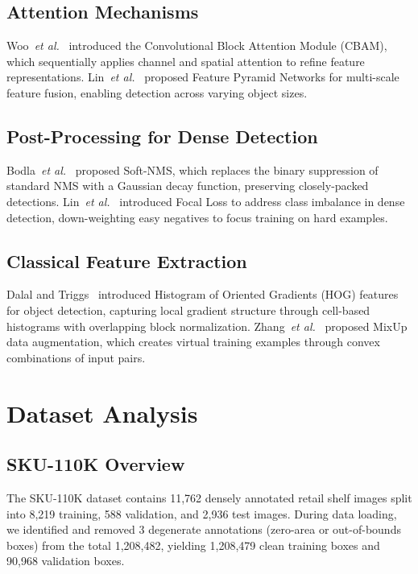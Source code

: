 \documentclass[conference]{IEEEtran}
\newcommand{\etal}{\emph{et al.}}
\begin{document}
\subsection{Attention Mechanisms}

Woo~\etal~\cite{woo2018cbam} introduced the Convolutional Block Attention
Module (CBAM), which sequentially applies channel and spatial attention to
refine feature representations. Lin~\etal~\cite{lin2017fpn} proposed Feature
Pyramid Networks for multi-scale feature fusion, enabling detection across
varying object sizes.

\subsection{Post-Processing for Dense Detection}

Bodla~\etal~\cite{bodla2017softnms} proposed Soft-NMS, which replaces the
binary suppression of standard NMS with a Gaussian decay function, preserving
closely-packed detections. Lin~\etal~\cite{lin2017focal} introduced Focal Loss
to address class imbalance in dense detection, down-weighting easy negatives
to focus training on hard examples.

\subsection{Classical Feature Extraction}

Dalal and Triggs~\cite{dalal2005hog} introduced Histogram of Oriented Gradients
(HOG) features for object detection, capturing local gradient structure through
cell-based histograms with overlapping block normalization. Zhang~\etal~\cite{zhang2017mixup} proposed MixUp data augmentation, which creates
virtual training examples through convex combinations of input pairs.

\section{Dataset Analysis}
\label{sec:dataset}

\subsection{SKU-110K Overview}

The SKU-110K dataset contains 11,762 densely annotated retail shelf images
split into 8,219 training, 588 validation, and 2,936 test images. During
data loading, we identified and removed 3 degenerate annotations (zero-area
or out-of-bounds boxes) from the total 1,208,482, yielding 1,208,479 clean
training boxes and 90,968 validation boxes.
\end{document}
